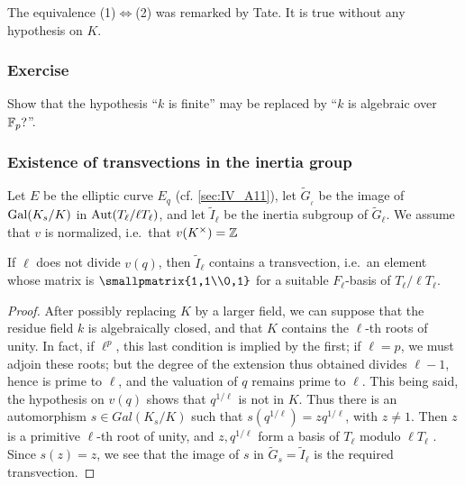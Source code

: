\begin{subappendices}
\begin{obs}
The equivalence (1)$\iff$(2) was remarked by Tate. It is true without any
hypothesis on $K$.
\end{obs}

\subsubsection*{Exercise}
Show that the hypothesis ``$k$ is finite'' may be replaced by ``$k$ is algebraic
over $\mathbb{F}_p?$''.


\subsubsection{Existence of transvections in the inertia group}
\label{sec:IV_A15}


Let $E$ be the elliptic curve $E_q$ (cf. \ref{sec:IV_A11}), let
$\tilde{G}__\ell$ be the image of $\operatorname{Gal}({K}_s/K)$ in $\operatorname{Aut}(T_\ell / \ell
T_\ell)$, and let $\tilde{I}_\ell$ be the inertia subgroup of $\tilde{G}_\ell$.
We assume that $v$ is normalized, i.e.\ that $v(K^\times) = \mathbb{Z}$
\dpage
\begin{prop}
If $\ell$ does not divide $v(q)$, then $\tilde{I}_\ell$ contains a transvection,
i.e.\ an element whose matrix is $\smallpmatrix{1,1\\0,1}$ for a suitable
$F_\ell$-basis of $T_\ell / \ell T_\ell$.
\end{prop}

\begin{proof}
After possibly replacing $K$ by a larger field, we can suppose
that the residue field $k$ is algebraically closed, and that $K$ contains
the $\ell$-th roots of unity. In fact, if $\ell ^ p$, this last condition is
implied by the first; if $\ell = p$, we must adjoin these roots; but the degree
of the extension thus obtained divides $\ell-1$, hence is prime to
$\ell$, and the valuation of $q$ remains prime to $\ell$. This being said, the
hypothesis on $v(q)$ shows that $q^{1/\ell}$ is not in $K$. Thus there is an
automorphism $s \in Gal(K_s/K)$ such that $s(q^{1/\ell}) = zq^{1/\ell}$, with $z
\neq 1$. Then $z$ is a
primitive $\ell$-th root of unity, and $z,q^{1/\ell}$ form
a basis of $T_\ell$ modulo $\ell T_\ell$ . Since $s(z) = z$, we see that the
image
of $s$ in $\tilde{G}_s = \tilde{I}_\ell$ is the required transvection.
\end{proof}


\end{subappendices}
